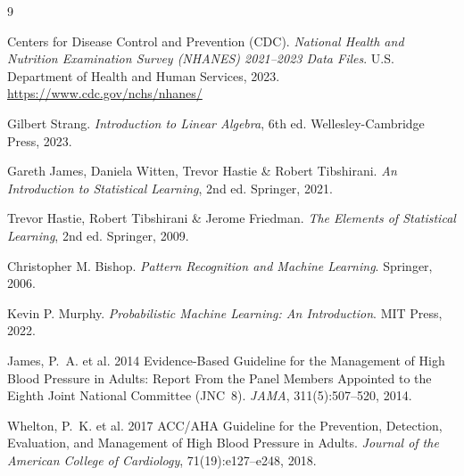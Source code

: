 \documentclass[12pt,a4paper]{article}
\begin{document}
\begin{thebibliography}{9}

Centers for Disease Control and Prevention (CDC). \textit{National Health and Nutrition Examination Survey (NHANES) 2021--2023 Data Files}. U.S. Department of Health and Human Services, 2023. \url{https://www.cdc.gov/nchs/nhanes/}

Gilbert Strang. \textit{Introduction to Linear Algebra}, 6th ed. Wellesley-Cambridge Press, 2023.

Gareth James, Daniela Witten, Trevor Hastie \& Robert Tibshirani. \textit{An Introduction to Statistical Learning}, 2nd ed. Springer, 2021.

Trevor Hastie, Robert Tibshirani \& Jerome Friedman. \textit{The Elements of Statistical Learning}, 2nd ed. Springer, 2009.

Christopher M. Bishop. \textit{Pattern Recognition and Machine Learning}. Springer, 2006.

Kevin P. Murphy. \textit{Probabilistic Machine Learning: An Introduction}. MIT Press, 2022.

James, P.~A. et al. 2014 Evidence-Based Guideline for the Management of
High Blood Pressure in Adults: Report From the Panel Members Appointed to
the Eighth Joint National Committee (JNC~8). \textit{JAMA}, 311(5):507--520, 2014.

Whelton, P.~K. et al. 2017 ACC/AHA Guideline for the Prevention, Detection,
Evaluation, and Management of High Blood Pressure in Adults.
\textit{Journal of the American College of Cardiology}, 71(19):e127--e248, 2018.

\end{thebibliography}
\end{document}
